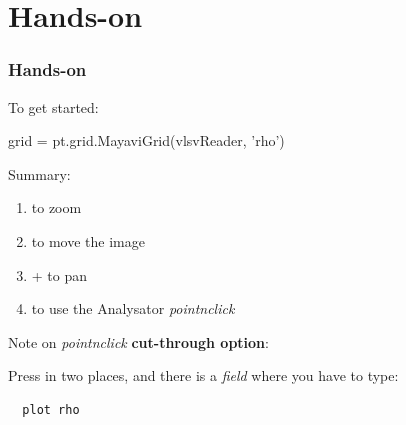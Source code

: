 \documentclass{beamer}
\begin{document}
\section{Hands-on}

\begin{frame}[fragile]
 \frametitle{Hands-on}
 
 To get started:
 
 \begin{python}[basicstyle=\tiny]
  grid = pt.grid.MayaviGrid(vlsvReader, 'rho')
 \end{python}
 
 Summary:
 
 \begin{enumerate}
  \item {} to zoom
  \item {} to move the image
  \item {} +  to pan
  \item {} to use the Analysator \emph{pointnclick}
 \end{enumerate}

 
 \tiny{Note on \emph{pointnclick} \textbf{cut-through option}:
 
 Press  in two places, and there is a \emph{field} where you have to type:}
 \begin{verbatim}
  plot rho
 \end{verbatim}
\end{frame}
\end{document}

